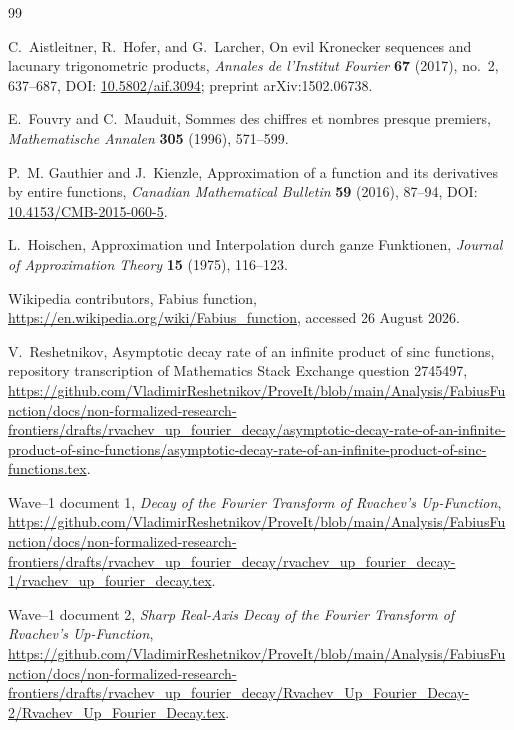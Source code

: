 \documentclass[11pt,oneside]{article}
\theoremstyle{definition}
\theoremstyle{remark}
\begin{document}
\begin{thebibliography}{99}

C.~Aistleitner, R.~Hofer, and G.~Larcher,
\newblock On evil Kronecker sequences and lacunary trigonometric products,
\newblock \emph{Annales de l'Institut Fourier} \textbf{67} (2017), no.~2,
637--687,
\newblock DOI: \href{https://doi.org/10.5802/aif.3094}{10.5802/aif.3094};
preprint arXiv:1502.06738.

E.~Fouvry and C.~Mauduit,
\newblock Sommes des chiffres et nombres presque premiers,
\newblock \emph{Mathematische Annalen} \textbf{305} (1996), 571--599.

P.~M. Gauthier and J.~Kienzle,
\newblock Approximation of a function and its derivatives by entire functions,
\newblock \emph{Canadian Mathematical Bulletin} \textbf{59} (2016), 87--94,
\newblock DOI: \href{https://doi.org/10.4153/CMB-2015-060-5}{10.4153/CMB-2015-060-5}.

L.~Hoischen,
\newblock Approximation und Interpolation durch ganze Funktionen,
\newblock \emph{Journal of Approximation Theory} \textbf{15} (1975), 116--123.

Wikipedia contributors,
\newblock Fabius function,
\newblock \url{https://en.wikipedia.org/wiki/Fabius_function}, accessed
26 August 2026.

V.~Reshetnikov,
\newblock Asymptotic decay rate of an infinite product of sinc functions,
\newblock repository transcription of Mathematics Stack Exchange question
2745497,
\newblock \url{https://github.com/VladimirReshetnikov/ProveIt/blob/main/Analysis/FabiusFunction/docs/non-formalized-research-frontiers/drafts/rvachev_up_fourier_decay/asymptotic-decay-rate-of-an-infinite-product-of-sinc-functions/asymptotic-decay-rate-of-an-infinite-product-of-sinc-functions.tex}.

\newblock Wave--1 document 1,
\newblock \emph{Decay of the Fourier Transform of Rvachev's Up-Function},
\newblock \url{https://github.com/VladimirReshetnikov/ProveIt/blob/main/Analysis/FabiusFunction/docs/non-formalized-research-frontiers/drafts/rvachev_up_fourier_decay/rvachev_up_fourier_decay-1/rvachev_up_fourier_decay.tex}.

\newblock Wave--1 document 2,
\newblock \emph{Sharp Real-Axis Decay of the Fourier Transform of Rvachev's Up-Function},
\newblock \url{https://github.com/VladimirReshetnikov/ProveIt/blob/main/Analysis/FabiusFunction/docs/non-formalized-research-frontiers/drafts/rvachev_up_fourier_decay/Rvachev_Up_Fourier_Decay-2/Rvachev_Up_Fourier_Decay.tex}.


\end{thebibliography}
\end{document}
